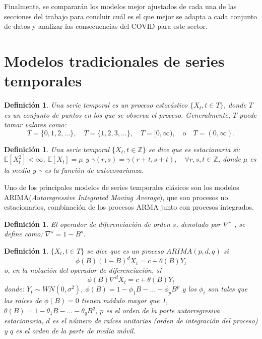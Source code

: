 \documentclass[12pt,twoside]{article}
\newtheorem{definition}[theorem]{Definición}
\begin{document}
Finalmente, se compararán los modelos mejor ajustados de cada una de las secciones del trabajo para concluir cuál es el que mejor se adapta a cada conjunto de datos y analizar las consecuencias del COVID para este sector. 



\newpage
\section{Modelos tradicionales de series temporales}\label{sec:34}

\begin{definition}
Una serie temporal \cite{sarima1} es un proceso estocástico $\{X_t, t \in T\}$, donde $T$ es un conjunto de puntos en los que se observa el proceso. Generalmente, $T$ puede tomar valores como:
\begin{equation}
T = \{0, 1, 2, \dots\}, \quad T = \{1, 2, 3, \dots\}, \quad T = [0, \infty), \quad \text{o} \quad T = (0, \infty).
\end{equation}
\end{definition}

\begin{definition}
Una serie temporal $\{X_t, t \in \mathbb{Z}\}$ se dice que es estacionaria si: $\mathbb{E}[X_t^2] < \infty$, $\mathbb{E}[X_t] = \mu$ y $\gamma(r, s) = \gamma(r + t, s + t), \quad \forall r, s, t \in \mathbb{Z}$, donde $\mu$ es la media y $\gamma$ es la función de autocovarianza.
\end{definition}

Uno de los principales modelos de series temporales clásicos son los modelos ARIMA(\textit{Autoregressive Integrated Moving Average}), que son procesos no estacionarios, combinación de los procesos ARMA junto con procesos integrados.

\begin{definition}El operador de diferenciación de orden $s$, denotado por $\nabla^s$ , se define como: $\nabla^s = 1 - B^s$.
\end{definition}


\begin{definition}
$\{X_t, t \in T\}$ se dice que es un proceso $ARIMA(p,d,q)$ si  
\begin{equation}
\phi(B)(1 - B)^d X_t = c + \theta(B) Y_t
\end{equation}
o, en la notación del operador de diferenciación, si  
\begin{equation}
\phi(B) \nabla^d X_t = c + \theta(B) Y_t
\end{equation}
donde: $Y_t \sim WN(0, \sigma^2)$, $\phi(B) = 1 - \phi_1 B - \dots - \phi_p B^p$ y los \( \phi_i \) son tales que las raíces de $\phi(B) = 0$ tienen módulo mayor que 1, $\theta(B) = 1 - \theta_1 B - \dots - \theta_q B^q$, $p$ es el orden de la parte autorregresiva estacionaria, $d$ es el número de raíces unitarias (orden de integración del proceso) y $q$ es el orden de la parte de media móvil.
\end{definition}
\end{document}
